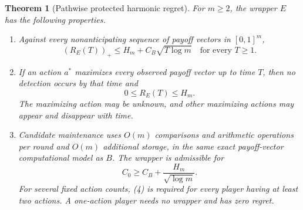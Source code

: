 \documentclass[11pt]{article}
\newtheorem{theorem}{Theorem}
\theoremstyle{definition}
\theoremstyle{remark}
\begin{document}
\begin{theorem}[Pathwise protected harmonic regret]\label{thm:harmonic}
For $m\geq2$, the wrapper $E$ has the following properties.
\begin{enumerate}
\item Against every nonanticipating sequence of payoff vectors in $[0,1]^m$,
\[
 (R_E(T))_+\leq H_m+C_B\sqrt{T\log m}
 \quad\text{for every }T\geq1.                         \tag{2}
\]
\item If an action $a^*$ maximizes every observed payoff vector up to time
$T$, then no detection occurs by that time and
\[
 0\leq R_E(T)\leq H_m.                                \tag{3}
\]
The maximizing action may be unknown, and other maximizing actions may
appear and disappear with time.
\item Candidate maintenance uses $O(m)$ comparisons and arithmetic
operations per round and $O(m)$ additional storage, in the same exact
payoff-vector computational model as $B$. The wrapper is admissible for
\[
 C_0\geq C_B+\frac{H_m}{\sqrt{\log m}}.                \tag{4}
\]
For several fixed action counts, (4) is required for every player having
at least two actions. A one-action player needs no wrapper and has zero
regret.
\end{enumerate}
\end{theorem}
\end{document}

